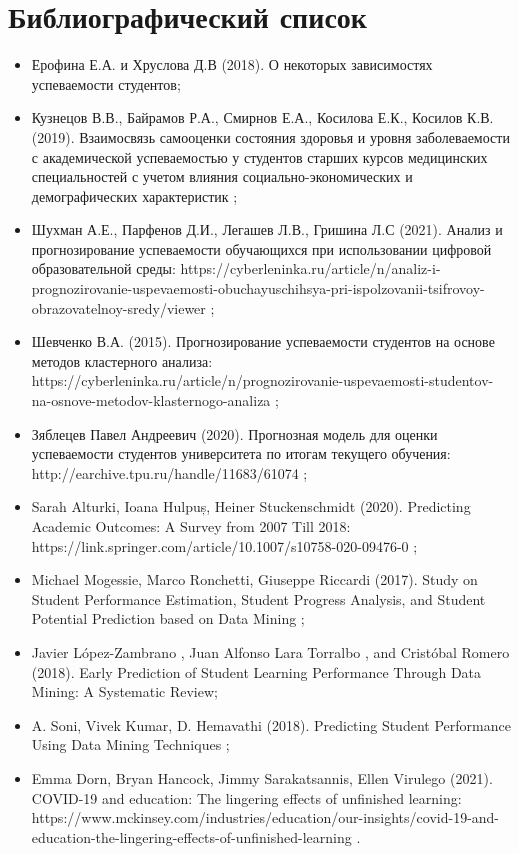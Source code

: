 \documentclass{article}
\begin{document}
\section*{Библиографический список}
\begin{itemize}
    \item Ерофина Е.А. и Хруслова Д.В (2018). О некоторых зависимостях успеваемости студентов;
    \item Кузнецов В.В., Байрамов Р.А., Смирнов Е.А., Косилова Е.К., Косилов К.В. (2019). Взаимосвязь самооценки состояния здоровья и уровня заболеваемости с академической успеваемостью у студентов старших курсов медицинских специальностей с учетом влияния социально-экономических и демографических характеристик ;
    \item Шухман А.Е., Парфенов Д.И., Легашев Л.В., Гришина Л.С (2021). Анализ и прогнозирование успеваемости обучающихся при использовании цифровой образовательной среды: https://cyberleninka.ru/article/n/analiz-i-prognozirovanie-uspevaemosti-obuchayuschihsya-pri-ispolzovanii-tsifrovoy-obrazovatelnoy-sredy/viewer ;
    \item Шевченко В.А. (2015). Прогнозирование успеваемости студентов на основе методов кластерного анализа: https://cyberleninka.ru/article/n/prognozirovanie-uspevaemosti-studentov-na-osnove-metodov-klasternogo-analiza ;
    \item Зяблецев Павел Андреевич (2020). Прогнозная модель для оценки успеваемости студентов университета по итогам текущего обучения: http://earchive.tpu.ru/handle/11683/61074 ;
    \item Sarah Alturki, Ioana Hulpuș, Heiner Stuckenschmidt (2020). Predicting Academic Outcomes: A Survey from 2007 Till 2018: https://link.springer.com/article/10.1007/s10758-020-09476-0 ;
    \item Michael Mogessie, Marco Ronchetti, Giuseppe Riccardi (2017). Study on Student Performance Estimation, Student Progress Analysis, and Student Potential Prediction based on Data Mining ;
    \item Javier López-Zambrano , Juan Alfonso Lara Torralbo , and Cristóbal Romero (2018). Early Prediction of Student Learning Performance Through Data Mining: A Systematic Review;
    \item A. Soni, Vivek Kumar, D. Hemavathi (2018). Predicting Student Performance Using Data Mining Techniques ;
    \item Emma Dorn, Bryan Hancock, Jimmy Sarakatsannis, Ellen Virulego (2021). COVID-19 and education: The lingering effects of unfinished learning: https://www.mckinsey.com/industries/education/our-insights/covid-19-and-education-the-lingering-effects-of-unfinished-learning .
\end{itemize}
\end{document}
